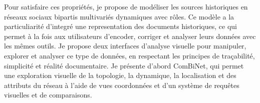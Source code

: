 {%
    Pour satisfaire ces propriétés, je propose de modéliser les sources historiques en réseaux sociaux bipartis multivariés dynamiques avec rôles.
    Ce modèle a la particuliarité d'integré une representation des documents historiques, ce qui permet à la fois aux utilisateurs d'encoder, corriger et analyser leurs données avec les mêmes outils.
    Je propose deux interfaces d'analyse visuelle pour manipuler, explorer et analyser ce type de données, en respectant les principes de traçabilité, simplicité et réalité documentaire.
    Je présente d'abord ComBiNet, qui permet une exploration visuelle de la topologie, la dynamique, la localisation et des attributs du réseau à l'aide de vues coordonnées et d'un système de requêtes visuelles et de comparaisons.

}
